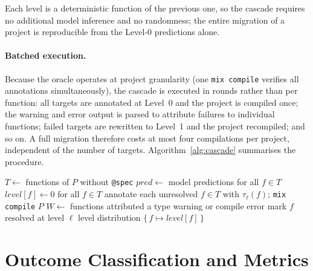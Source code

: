 Each level is a deterministic function of the previous one, so the cascade requires no additional model inference and no randomness; the entire migration of a project is reproducible from the Level-0 predictions alone.

\paragraph{Batched execution.}
Because the oracle operates at project granularity (one \texttt{mix compile} verifies all annotations simultaneously), the cascade is executed in rounds rather than per function:
all targets are annotated at Level~0 and the project is compiled once; the warning and error output is parsed to attribute failures to individual functions; failed targets are rewritten to Level~1 and the project recompiled; and so on.
A full migration therefore costs at most four compilations per project, independent of the number of targets.
Algorithm~\ref{alg:cascade} summarises the procedure.

\begin{algorithm}
\caption{Cascading migration of a project $P$}
\label{alg:cascade}
\begin{algorithmic}[1]
\State $T \gets$ functions of $P$ without \texttt{@spec} 
\State $\mathit{pred} \gets$ model predictions for all $f \in T$ 
\State $\mathit{level}[f] \gets 0$ for all $f \in T$
    \State annotate each unresolved $f \in T$ with $\tau_\ell(f)$; \texttt{mix compile} $P$
    \State $W \gets$ functions attributed a type warning or compile error
        \State mark $f$ resolved at level $\ell$
    \EndFor
\EndFor
\State \Return level distribution $\{\,f \mapsto \mathit{level}[f]\,\}$
\end{algorithmic}
\end{algorithm}

\section{Outcome Classification and Metrics}
\label{sec:migration-metrics}


